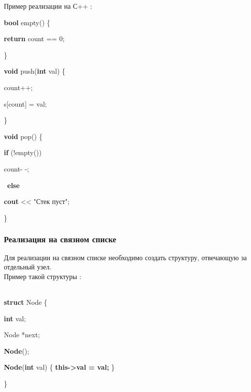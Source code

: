 Пример реализации на С++ :

\begin{algorithm}
	\begin{algorithmic}
		\State \textbf{bool} empty() \{

		\State \hspace{1cm} \textbf{return} count == 0;

		\State \}

		\vspace{0.5cm}

		\State \textbf{void} push(\textbf{int} val) \{

		\State \hspace{1cm} count++;

		\State \hspace{1cm} s[count] = val;

		\State \}

		\vspace{0.5cm}

		\State \textbf{void} pop() \{

		\State \hspace{1cm} \textbf{if} (!empty()) \

		\State \hspace{2cm} count- -;

		\State \hspace{1cm} \ \textbf{else} \

		\State \hspace{2cm} \textbf{cout} << "Стек пуст";

		\State \}

	\end{algorithmic}
\end{algorithm}




\subsubsection{Реализация на связном списке}
Для реализации на связном списке необходимо создать структуру, отвечающую за отдельный узел.\\

Пример такой структуры :
\begin{algorithm}
	\begin{algorithmic}
		\State\\
		\textbf{struct} Node \{

		\State \quad \textbf{int} val;

		\State \quad Node *next;

		\State \quad \textbf{Node}();

		\State \quad \textbf{Node}(\textbf{int} val) \{ \textbf{this->val = val;} \}
		\State

		\}
	\end{algorithmic}
\end{algorithm}\\


